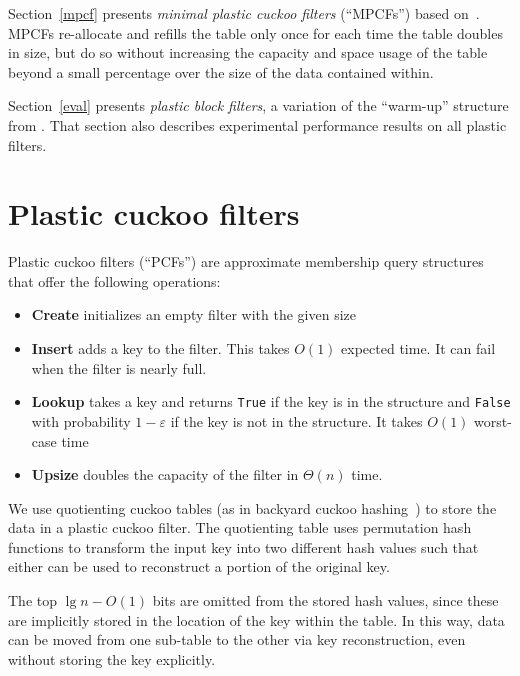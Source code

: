 \documentclass[letterpaper, 11pt]{article}
\begin{document}
Section~\ref{mpcf} presents {\em minimal plastic cuckoo filters} (``MPCFs'') based on~\cite{dysect}.
MPCFs re-allocate and refills the table only once for each time the table doubles in size, but do so without increasing the capacity and space usage of the table beyond a small percentage over the size of the data contained within.

Section~\ref{eval} presents {\em plastic block filters}, a variation of the ``warm-up'' structure from \cite{psw}.
That section also describes experimental performance results on all plastic filters.

\section{Plastic cuckoo filters}
\label{pcf}
Plastic cuckoo filters (``PCFs'') are approximate membership query structures that offer the following operations:

\begin{itemize}
\item {\bf Create} initializes an empty filter with the given size
\item {\bf Insert} adds a key to the filter.
  This takes $O(1)$ expected time.
  It can fail when the filter is nearly full.
\item {\bf Lookup} takes a key and returns \verb|True| if the key is in the structure and \verb|False| with probability $1-\varepsilon$ if the key is not in the structure.
  It takes $O(1)$ worst-case time
\item {\bf Upsize} doubles the capacity of the filter in $\Theta(n)$ time.
\end{itemize}

We use quotienting cuckoo tables (as in backyard cuckoo hashing~\cite{backyard}) to store the data in a plastic cuckoo filter.
The quotienting table uses permutation hash functions to transform the input key into two different hash values such that either can be used to reconstruct a portion of the original key.

The top $\lg n - O(1)$ bits are omitted from the stored hash values, since these are implicitly stored in the location of the key within the table.
In this way, data can be moved from one sub-table to the other via key reconstruction, even without storing the key explicitly.
\end{document}
